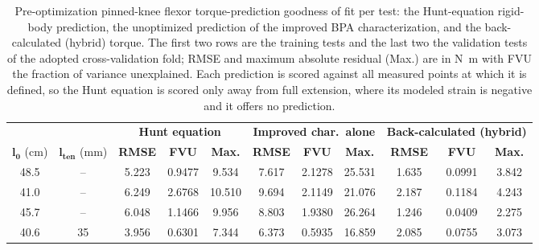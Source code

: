 \documentclass[utf8]{FrontiersinHarvard} %
\renewcommand{\arraystretch}{2}  %
\begin{document}
\begin{table}[H]
\caption{Pre-optimization pinned-knee flexor torque-prediction goodness of fit per test: the Hunt-equation rigid-body prediction, the unoptimized prediction of the improved BPA characterization, and the back-calculated (hybrid) torque. The first two rows are the training tests and the last two the validation tests of the adopted cross-validation fold; RMSE and maximum absolute residual (Max.) are in \unit{\newton\meter} with FVU the fraction of variance unexplained. Each prediction is scored against all measured points at which it is defined, so the Hunt equation is scored only away from full extension, where its modeled strain is negative and it offers no prediction.}
\label{tab:FlxPinPreGof}
\centering
\begingroup
\renewcommand{\arraystretch}{1.4}%
\fontsize{10pt}{12pt}\selectfont
\begin{tabular}{@{}cc ccc ccc ccc@{}}
\toprule
& & \multicolumn{3}{c}{\textbf{Hunt equation}} & \multicolumn{3}{c}{\textbf{Improved char.\ alone}} & \multicolumn{3}{c}{\textbf{Back-calculated (hybrid)}} \\
\cmidrule(lr){3-5} \cmidrule(lr){6-8} \cmidrule(l){9-11}
$\boldsymbol{l_{0}}$ (\unit{\cm}) & $\boldsymbol{l_{\text{ten}}}$ (\unit{\mm}) & \textbf{RMSE} & \textbf{FVU} & \textbf{Max.} & \textbf{RMSE} & \textbf{FVU} & \textbf{Max.} & \textbf{RMSE} & \textbf{FVU} & \textbf{Max.} \\
\midrule
48.5 & -- & 5.223 & 0.9477 & 9.534 & 7.617 & 2.1278 & 25.531 & 1.635 & 0.0991 & 3.842 \\
41.0 & -- & 6.249 & 2.6768 & 10.510 & 9.694 & 2.1149 & 21.076 & 2.187 & 0.1184 & 4.243 \\
\midrule
45.7 & -- & 6.048 & 1.1466 & 9.956 & 8.803 & 1.9380 & 26.264 & 1.246 & 0.0409 & 2.275 \\
40.6 & 35 & 3.956 & 0.6301 & 7.344 & 6.373 & 0.5935 & 16.859 & 2.085 & 0.0755 & 3.073 \\
\bottomrule
\end{tabular}
\endgroup
\end{table}
\end{document}
